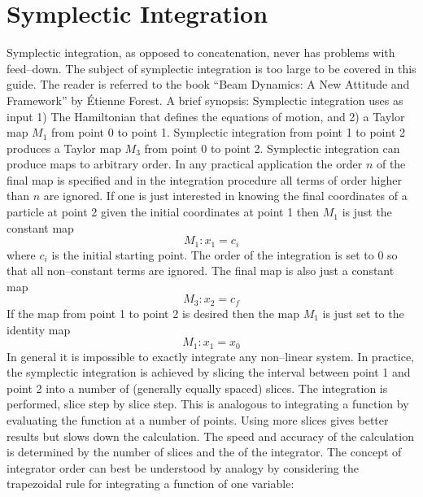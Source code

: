 \section{Symplectic Integration}
\label{s:symp.integ}

Symplectic integration, as opposed to concatenation, never has
problems with feed--down. The subject of symplectic integration is too
large to be covered in this guide. The reader is referred to the book
``Beam Dynamics: A New Attitude and Framework'' by \'Etienne
Forest\cite{b:forest}. A brief synopsis: Symplectic integration uses
as input 1) The Hamiltonian that defines the equations of motion, and
2) a Taylor map $M_1$ from point 0 to point 1. Symplectic integration
from point 1 to point 2 produces a Taylor map $M_3$ from point 0 to
point 2. Symplectic integration can produce maps to arbitrary
order. In any practical application the order $n$ of the final map is
specified and in the integration procedure all terms of order higher
than $n$ are ignored. If one is just interested in knowing the final
coordinates of a particle at point 2 given the initial coordinates at
point 1 then $M_1$ is just the constant map
\begin{equation}
  M_1: x_1 = c_i
\end{equation}
where $c_i$ is the initial starting point. The order of the
integration is set to 0 so that all non--constant terms are
ignored. The final map is also just a constant map
\begin{equation}
  M_3: x_2 = c_f
\end{equation}
If the map from point 1 to point 2 is desired then the map $M_1$ is
just set to the identity map
\begin{equation}
  M_1: x_1 = x_0
\end{equation}
In general it is impossible to exactly integrate any non--linear
system. In practice, the symplectic integration is achieved by slicing
the interval between point 1 and point 2 into a number of (generally
equally spaced) slices. The integration is performed, slice step by
slice step. This is analogous to integrating a function by evaluating
the function at a number of points. Using more slices gives better
results but slows down the calculation. The speed and accuracy of the
calculation is determined by the number of slices and the 
of the integrator. The concept of integrator order can best be
understood by analogy by considering the trapezoidal rule for
integrating a function of one variable:
